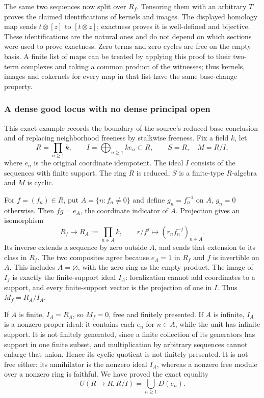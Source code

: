 The same two sequences now split over \(R_f\). Tensoring them with an arbitrary \(T\) proves the claimed identifications of kernels and images. The displayed homology map sends \(t\otimes[z]\) to \([t\otimes z]\); exactness proves it is well-defined and bijective. These identifications are the natural ones and do not depend on which sections were used to prove exactness. Zero terms and zero cycles are free on the empty basis. A finite list of maps can be treated by applying this proof to their two-term complexes and taking a common product of the witnesses; thus kernels, images and cokernels for every map in that list have the same base-change property.

\subsubsection{A dense good locus with no dense principal open}\label{algebra-proof-027-a-dense-good-locus-with-no-dense-principal-open}

This exact example records the boundary of the source's reduced-base conclusion and of replacing neighborhood freeness by stalkwise freeness. Fix a field \(k\), let \[
 R=\prod_{n\ge1}k,\qquad I=\bigoplus_{n\ge1} k e_n\subset R,\qquad
 S=R,\quad M=R/I,
\] where \(e_n\) is the original coordinate idempotent. The ideal \(I\) consists of the sequences with finite support. The ring \(R\) is reduced, \(S\) is a finite-type \(R\)-algebra and \(M\) is cyclic.

For \(f=(f_n)\in R\), put \(A=\{n:f_n\ne0\}\) and define \(g_n=f_n^{-1}\) on \(A\), \(g_n=0\) otherwise. Then \(fg=e_A\), the coordinate indicator of \(A\). Projection gives an isomorphism \[
 R_f\longrightarrow R_A:=\prod_{n\in A}k,\qquad
 r/f^j\longmapsto (r_n f_n^{-j})_{n\in A}.
\] Its inverse extends a sequence by zero outside \(A\), and sends that extension to its class in \(R_f\). The two composites agree because \(e_A=1\) in \(R_f\) and \(f\) is invertible on \(A\). This includes \(A=\varnothing\), with the zero ring as the empty product. The image of \(I_f\) is exactly the finite-support ideal \(I_A\): localization cannot add coordinates to a support, and every finite-support vector is the projection of one in \(I\). Thus \(M_f=R_A/I_A\).

If \(A\) is finite, \(I_A=R_A\), so \(M_f=0\), free and finitely presented. If \(A\) is infinite, \(I_A\) is a nonzero proper ideal: it contains each \(e_n\) for \(n\in A\), while the unit has infinite support. It is not finitely generated, since a finite collection of its generators has support in one finite subset, and multiplication by arbitrary sequences cannot enlarge that union. Hence its cyclic quotient is not finitely presented. It is not free either: its annihilator is the nonzero ideal \(I_A\), whereas a nonzero free module over a nonzero ring is faithful. We have proved the exact equality \[
 U(R\to R,R/I)=\bigcup_{n\ge1}D(e_n).
\]

